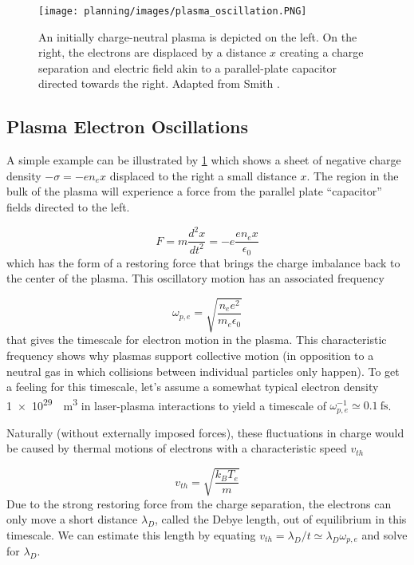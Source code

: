 \begin{figure}
	\centering
	\texttt{[image: planning/images/plasma\_oscillation.PNG]}
	\caption{An initially charge-neutral plasma is depicted on the left. On the right, the electrons are displaced by a distance $x$ creating a charge separation and electric field akin to a parallel-plate capacitor directed towards the right. Adapted from Smith \cite{Smith_2020_Thesis}.}
	\label{fig:plasma_oscillation}
\end{figure}

\subsection{Plasma Electron Oscillations}
A simple example can be illustrated by \cref{fig:plasma_oscillation} which shows a sheet of negative charge density $-\sigma = -e n_e x$ displaced to the right a small distance $x$. The region in the bulk of the plasma will experience a force from the parallel plate ``capacitor'' fields directed to the left.

\begin{equation}
	F = m \frac{d^2 x}{d t^2} = - e \frac{e n_e x}{\epsilon_0}
\end{equation}
which has the form of a restoring force that brings the charge imbalance back to the center of the plasma. This oscillatory motion has an associated frequency 

\begin{equation}
	\omega_{p,e} = \sqrt{\frac{n_e e^2}{m_e \epsilon_0}} \label{eq:omegape}
\end{equation}
that gives the timescale for electron motion in the plasma. This characteristic frequency shows why plasmas support collective motion (in opposition to a neutral gas in which collisions between individual particles only happen). To get a feeling for this timescale, let's assume a somewhat typical electron density \SI{1e29}{\per \meter \cubed} in laser-plasma interactions to yield a timescale of $\omega_{p,e}^{-1} \simeq \SI{0.1}{\femto \second}$.

Naturally (without externally imposed forces), these fluctuations in charge would be caused by thermal motions of electrons with a characteristic speed $v_{th}$ 

\begin{equation}
	v_{th} = \sqrt{\frac{k_B T_e}{m}} \label{eq:vthermal}
\end{equation}
Due to the strong restoring force from the charge separation, the electrons can only move a short distance $\lambda_D$, called the Debye length, out of equilibrium in this timescale. We can estimate this length by equating $v_{th} = \lambda_D / t \simeq \lambda_D \omega_{p,e}$ and solve for $\lambda_D$.

